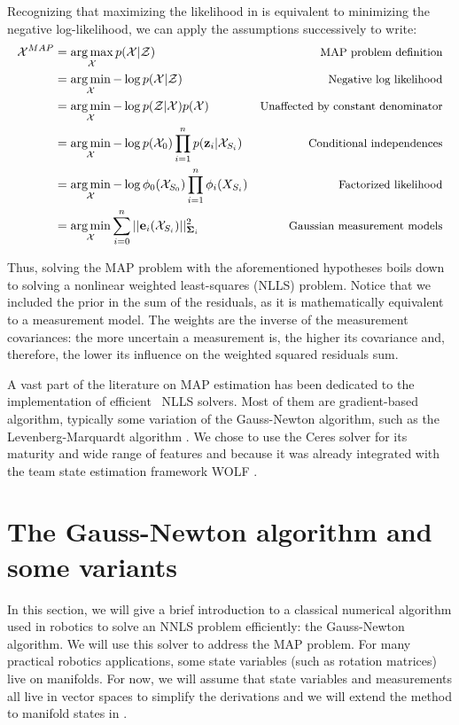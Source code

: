 Recognizing that maximizing the likelihood in  is equivalent to minimizing the negative log-likelihood, we can
apply the assumptions successively to write:
%
\begin{align}
    \mathcal{X}^{MAP} 
    &= \operatorname*{arg\,max}_{\mathcal{X}} p(\mathcal{X} | \mathcal{Z}) &\text{\small MAP problem definition}
    \\
    &= \operatorname*{arg\,min}_{\mathcal{X}} - \log p(\mathcal{X} | \mathcal{Z}) &\text{\small Negative log likelihood}
    \\
    &= \operatorname*{arg\,min}_{\mathcal{X}} - \log p(\mathcal{Z} | \mathcal{X}) p(\mathcal{X}) &\text{\small Unaffected by constant denominator}
    \\
    &= \operatorname*{arg\,min}_{\mathcal{X}} - \log p(\mathcal{X}_0) \prod_{i=1}^{n} p({\bf z}_i | \mathcal{X}_{S_i})  &\text{\small Conditional independences}
    \\
    &= \operatorname*{arg\,min}_{\mathcal{X}} - \log \phi_0(\mathcal{X}_{S_0}) \prod_{i=1}^{n} \phi_i(X_{S_i}) &\text{\small Factorized likelihood}  \label{eq:factorized_likelihood}
    \\
    &= \operatorname*{arg\,min}_{\mathcal{X}}  \sum_{i=0}^{n} ||{\bf e}_i(\mathcal{X}_{S_i})||_{{\bm \Sigma}_i}^2  &\text{\small Gaussian measurement models} \label{eq:nlls_map_pbe}
\end{align}

Thus, solving the MAP problem with the aforementioned hypotheses boils down to solving a nonlinear weighted least-squares (NLLS) problem.
Notice that we included the prior in the sum of the residuals, as it is mathematically equivalent to a measurement model. 
The weights are the inverse of the measurement covariances: the more uncertain a measurement is, the higher its covariance and, therefore, the lower its influence
on the weighted squared residuals sum. 

A vast part of the literature on MAP estimation has been dedicated to the implementation of efficient \adhoc\ NLLS solvers. Most of them are 
gradient-based algorithm, typically some variation of the Gauss-Newton algorithm, such as the Levenberg-Marquardt algorithm \cite{boyd2004convex}.
We chose to use the Ceres solver \cite{ceres-solver} for its maturity and wide range of features and because it was already integrated with the team state 
estimation framework WOLF \cite{sola2021wolf}.





%
%
%
%
%
%
%
\section{The Gauss-Newton algorithm and some variants}
In this section, we will give a brief introduction to a classical numerical algorithm used in robotics to solve an NNLS problem efficiently: the Gauss-Newton algorithm.
We will use this solver to address the MAP problem.
For many practical robotics applications, some state variables (such as rotation matrices) live on manifolds. For now, we will assume that state variables and measurements 
all live in vector spaces to simplify the derivations and we will extend the method to manifold states in . 

